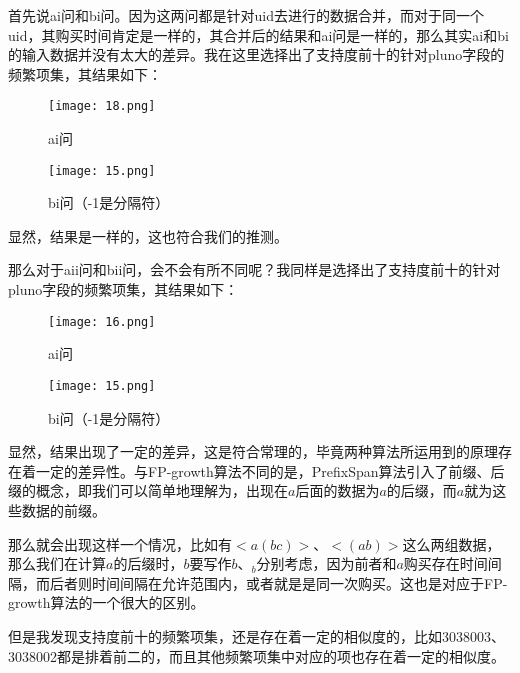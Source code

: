 \documentclass{article}
\begin{document}
\begin{CJK}{UTF8}{gbsn}
首先说ai问和bi问。因为这两问都是针对uid去进行的数据合并，而对于同一个uid，其购买时间肯定是一样的，其合并后的结果和ai问是一样的，那么其实ai和bi的输入数据并没有太大的差异。我在这里选择出了支持度前十的针对pluno字段的频繁项集，其结果如下：

\begin{figure}[!h]
\begin{center}
  \texttt{[image: 18.png]}
  \caption{ai问}	
\end{center}
\end{figure}

\clearpage
\begin{figure}[!h]
\begin{center}
  \texttt{[image: 15.png]}	
  \caption{bi问（-1是分隔符）}
\end{center}
\end{figure}

显然，结果是一样的，这也符合我们的推测。

那么对于aii问和bii问，会不会有所不同呢？我同样是选择出了支持度前十的针对pluno字段的频繁项集，其结果如下：

\begin{figure}[!h]
\begin{center}
  \texttt{[image: 16.png]}
  \caption{ai问}	
\end{center}
\end{figure}

\begin{figure}[!h]
\begin{center}
  \texttt{[image: 15.png]}	
  \caption{bi问（-1是分隔符）}
\end{center}
\end{figure}

显然，结果出现了一定的差异，这是符合常理的，毕竟两种算法所运用到的原理存在着一定的差异性。与FP-growth算法不同的是，PrefixSpan算法引入了前缀、后缀的概念，即我们可以简单地理解为，出现在$a$后面的数据为$a$的后缀，而$a$就为这些数据的前缀。

那么就会出现这样一个情况，比如有$<a(bc)>$、$<(ab)>$这么两组数据，那么我们在计算$a$的后缀时，$b$要写作$b$、$_b$分别考虑，因为前者和$a$购买存在时间间隔，而后者则时间间隔在允许范围内，或者就是是同一次购买。这也是对应于FP-growth算法的一个很大的区别。

但是我发现支持度前十的频繁项集，还是存在着一定的相似度的，比如3038003、3038002都是排着前二的，而且其他频繁项集中对应的项也存在着一定的相似度。


\end{CJK}
\end{document}
